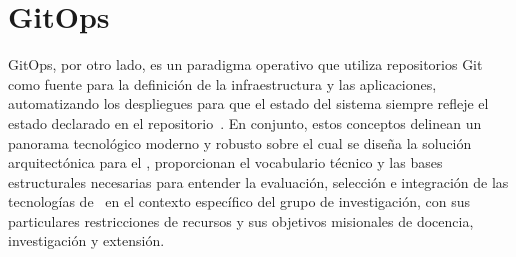 \section{GitOps}
\noindent
GitOps, por otro lado, es un paradigma operativo que utiliza repositorios Git como fuente para la definición de la infraestructura y las aplicaciones, automatizando los despliegues para que el estado del sistema siempre refleje el estado declarado en el repositorio~\citep{kormanik2023exploring}. En conjunto, estos conceptos delinean un panorama tecnológico moderno y robusto sobre el cual se diseña la solución arquitectónica para el \GRID, proporcionan el vocabulario técnico y las bases estructurales necesarias para entender la evaluación, selección e integración de las tecnologías de \VBC\ en el contexto específico del grupo de investigación, con sus particulares restricciones de recursos y sus objetivos misionales de docencia, investigación y extensión.


